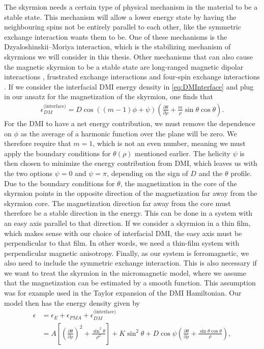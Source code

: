 The skyrmion needs a certain type of physical mechanism in the material to be a stable state. This mechanism will allow a lower energy state by having the neighbouring spins not be entirely parallel to each other, like the symmetric exchange interaction wants them to be. One of these mechanisms is the Dzyaloshinskii--Moriya interaction, which is the stabilizing mechanism of skyrmions we will consider in this thesis. Other mechanisms that can also cause the magnetic skyrmion to be a stable state are long-ranged magnetic dipolar interactions \cite{Lin1973}, frustrated exchange interactions \cite{Okubo2012} and four-spin exchange interactions \cite{Heinze2011}. If we consider the interfacial DMI energy density in \eqref{eq:DMInterface} and plug in our ansatz for the magnetization of the skyrmion, one finds that
\begin{align}
\epsilon_{DM}^{\textrm{(interface)}} = D\cos((m-1)\phi + \psi)\left(\frac{\partial\theta}{\partial\rho} + \frac{m}{\rho}\sin\theta\cos\theta\right).
\end{align}
For the DMI to have a net energy contribution, we must remove the dependence on $\phi$ as the average of a harmonic function over the plane will be zero. We therefore require that $m = 1$, which is not an even number, meaning we must apply the boundary conditions for $\theta(\rho)$ mentioned earlier. The helicity $\psi$ is then chosen to minimize the energy contribution from DMI, which leaves us with the two options $\psi = 0$ and $\psi = \pi$, depending on the sign of $D$ and the $\theta$ profile. Due to the boundary conditions for $\theta$, the magnetization in the core of the skyrmion points in the opposite direction of the magnetization far away from the skyrmion core. The magnetization direction far away from the core must therefore be a stable direction in the energy. This can be done in a system with an easy axis parallel to that direction. If we consider a skyrmion in a thin film, which makes sense with our choice of interfacial DMI, the easy axis must be perpendicular to that film. In other words, we need a thin-film system with perpendicular magnetic anisotropy. Finally, as our system is ferromagnetic, we also need to include the symmetric exchange interaction. This is also necessary if we want to treat the skyrmion in the micromagnetic model, where we assume that the magnetization can be estimated by a smooth function. This assumption was for example used in the Taylor expansion of the DMI Hamiltonian. Our model then has the energy density given by
\begin{align}
\nonumber \epsilon &= \epsilon_E + \epsilon_{PMA} + \epsilon_{DM}^{\textrm{(interface)}} \\
&=A \left[\left(\frac{\partial\theta}{\partial\rho}\right)^2 + \frac{\sin^2\theta}{\rho^2}\right] + K\sin^2\theta + D\cos\psi\left(\frac{\partial\theta}{\partial\rho} + \frac{\sin\theta\cos\theta}{\rho}\right),
\end{align}
